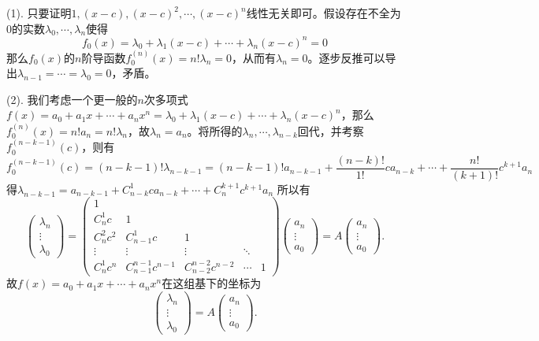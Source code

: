 (1). 只要证明$1, (x-c), (x-c)^2, \cdots, (x-c)^n$线性无关即可。假设存在不全为0的实数$\lambda_0,\cdots,\lambda_n$使得
$$f_0(x) = \lambda_0 + \lambda_1(x-c) + \cdots + \lambda_n(x-c)^n = 0$$
那么$f_0(x)$的$n$阶导函数$f_0^{(n)}(x) = n!\lambda_n = 0$，从而有$\lambda_n = 0$。逐步反推可以导出$\lambda_{n-1} = \cdots = \lambda_0 = 0$，矛盾。

(2). 我们考虑一个更一般的$n$次多项式$f(x) = a_0 + a_1x + \cdots + a_nx^n = \lambda_0 + \lambda_1(x-c) + \cdots + \lambda_n(x-c)^n$，那么$f_0^{(n)}(x) = n! a_n = n! \lambda_n$，故$\lambda_n = a_n$。将所得的$\lambda_n,\cdots,\lambda_{n-k}$回代，并考察$f_0^{(n-k-1)}(c)$，则有
$$
f_0^{(n-k-1)}(c) = (n-k-1)!\lambda_{n-k-1} = (n-k-1)!a_{n-k-1} + \dfrac{(n-k)!}{1!} c a_{n-k} + \cdots + \dfrac{n!}{(k+1)!} c^{k+1} a_{n}
$$
得$\lambda_{n-k-1} = a_{n-k-1} + C_{n-k}^1c a_{n-k} + \cdots + C_{n}^{k+1}c^{k+1} a_{n}$
所以有
$$
\begin{pmatrix} \lambda_n \\ \vdots \\ \lambda_0 \end{pmatrix}
= \begin{pmatrix} 1 & & & & \\ C_{n}^1c & 1 & & & \\ C_{n}^2c^2 & C_{n-1}^1c & 1 & & \\ \vdots & \vdots & \vdots & \ddots & \\ C_{n}^1c^n & C_{n-1}^{n-1}c^{n-1} & C_{n-2}^{n-2}c^{n-2} & \cdots & 1 \end{pmatrix}
\begin{pmatrix} a_n \\ \vdots \\ a_0 \end{pmatrix} = A\begin{pmatrix} a_n \\ \vdots \\ a_0 \end{pmatrix}.
$$
故$f(x) = a_0 + a_1x + \cdots + a_nx^n$在这组基下的坐标为
$$\begin{pmatrix} \lambda_n \\ \vdots \\ \lambda_0 \end{pmatrix} = A \begin{pmatrix} a_n \\ \vdots \\ a_0 \end{pmatrix}.$$

